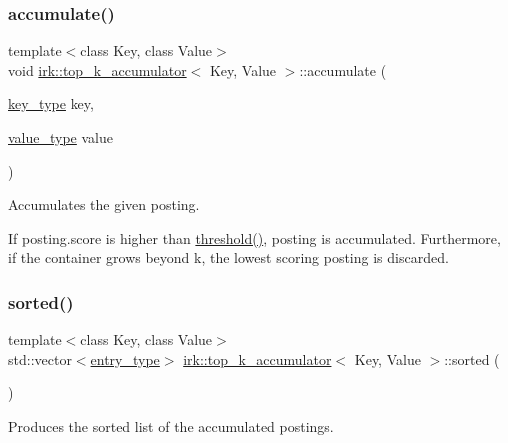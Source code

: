 \subsubsection{\texorpdfstring{accumulate()}{accumulate()}}
{\footnotesize\ttfamily template$<$class Key, class Value$>$ \\
void \mbox{\hyperlink{classirk_1_1top__k__accumulator}{irk\+::top\+\_\+k\+\_\+accumulator}}$<$ Key, Value $>$\+::accumulate (\begin{DoxyParamCaption}\item[{\mbox{\hyperlink{classirk_1_1top__k__accumulator_a2476f5b995fe252f092590c05f48e61f}{key\+\_\+type}}}]{key,  }\item[{\mbox{\hyperlink{classirk_1_1top__k__accumulator_ad96657e9478dcbab995f3bf38954b5bd}{value\+\_\+type}}}]{value }\end{DoxyParamCaption})\hspace{0.3cm}{\ttfamily [inline]}}



Accumulates the given posting. 

If {\ttfamily posting.\+score} is higher than \mbox{\hyperlink{classirk_1_1top__k__accumulator_a70f24ee6364940d0ea95cb6aa9eca510}{threshold()}}, {\ttfamily posting} is accumulated. Furthermore, if the container grows beyond {\ttfamily k}, the lowest scoring posting is discarded. \mbox{\label{classirk_1_1top__k__accumulator_a8655daf7599408d45f9ee1be82d0c0a5}} 
\subsubsection{\texorpdfstring{sorted()}{sorted()}}
{\footnotesize\ttfamily template$<$class Key, class Value$>$ \\
std\+::vector$<$\mbox{\hyperlink{classirk_1_1top__k__accumulator_a0eacc4cbf280b54983e25b9d34bd91c0}{entry\+\_\+type}}$>$ \mbox{\hyperlink{classirk_1_1top__k__accumulator}{irk\+::top\+\_\+k\+\_\+accumulator}}$<$ Key, Value $>$\+::sorted (\begin{DoxyParamCaption}{ }\end{DoxyParamCaption})\hspace{0.3cm}{\ttfamily [inline]}}



Produces the sorted list of the accumulated postings. 


